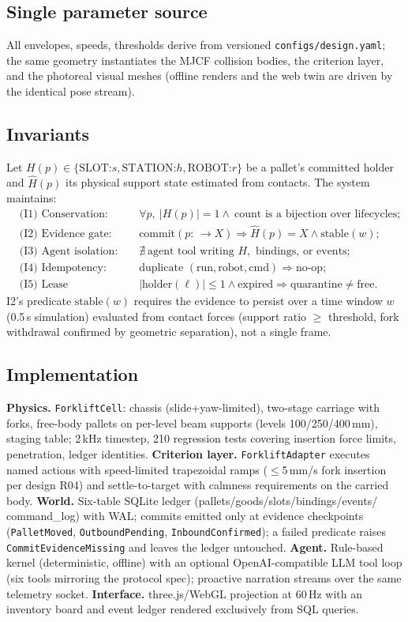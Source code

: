 \documentclass[11pt]{article}
\begin{document}
\subsection{Single parameter source}
All envelopes, speeds, thresholds derive from versioned
\texttt{configs/design.yaml}; the same geometry instantiates the MJCF collision
bodies, the criterion layer, and the photoreal visual meshes (offline renders
and the web twin are driven by the identical pose stream).

\subsection{Invariants}
Let $H(p)\in\{\text{SLOT:}s,\text{STATION:}h,\text{ROBOT:}r\}$ be a pallet's
committed holder and $\hat H(p)$ its physical support state estimated from
contacts. The system maintains:
\begin{align}
&\text{(I1) Conservation:} && \forall p,\ |H(p)|=1 \wedge\ \text{count is a bijection over lifecycles};\\
&\text{(I2) Evidence gate:} && \text{commit}(p{:}\,\to X) \Rightarrow \hat H(p)=X \wedge \text{stable}(w);\\
&\text{(I3) Agent isolation:} && \nexists\ \text{agent tool writing } H,\text{ bindings, or events};\\
&\text{(I4) Idempotency:} && \text{duplicate }(\text{run},\text{robot},\text{cmd}) \Rightarrow \text{no-op};\\
&\text{(I5) Lease exclusivity:} && |\text{holder}(\ell)|\le 1 \wedge \text{expired} \Rightarrow \text{quarantine} \neq \text{free}.
\end{align}
I2's predicate $\text{stable}(w)$ requires the evidence to persist over a
time window $w$ (0.5\,s simulation) evaluated from contact forces
(support ratio $\ge$ threshold, fork withdrawal confirmed by geometric
separation), not a single frame.

\subsection{Implementation}
\textbf{Physics.} \texttt{ForkliftCell}: chassis (slide+yaw-limited),
two-stage carriage with forks, free-body pallets on per-level beam supports
(levels 100/250/400\,mm), staging table; 2\,kHz timestep, 210 regression tests
covering insertion force limits, penetration, ledger identities.
\textbf{Criterion layer.} \texttt{ForkliftAdapter} executes named actions with
speed-limited trapezoidal ramps ($\le$5\,mm/s fork insertion per design R04)
and settle-to-target with calmness requirements on the carried body.
\textbf{World.} Six-table SQLite ledger (pallets/goods/slots/bindings/events/
command\_log) with WAL; commits emitted only at evidence checkpoints
(\texttt{PalletMoved}, \texttt{OutboundPending}, \texttt{InboundConfirmed});
a failed predicate raises \texttt{CommitEvidenceMissing} and leaves the ledger
untouched.
\textbf{Agent.} Rule-based kernel (deterministic, offline) with an optional
OpenAI-compatible LLM tool loop (six tools mirroring the protocol spec);
proactive narration streams over the same telemetry socket.
\textbf{Interface.} three.js/WebGL projection at 60\,Hz with an inventory board
and event ledger rendered exclusively from SQL queries.
\end{document}
